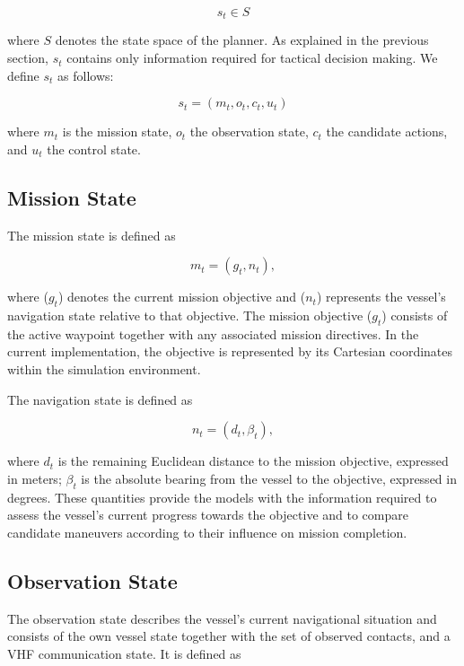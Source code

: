 \documentclass[10pt]{reportMaster}
\begin{document}
\begin{equation}
    s_t \in S
\end{equation}

where $S$ denotes the state space of the planner. As explained in the previous section, $s_t$ contains only information required for tactical decision making. We define $s_t$ as follows:

\begin{equation}
    s_t = (m_t, o_t, c_t, u_t)
\end{equation}

where $m_t$ is the mission state, $o_t$ the observation state, $c_t$ the candidate actions, and $u_t$ the control state.

\subsection{Mission State}

The mission state is defined as

\begin{equation}
m_t = (g_t, n_t),
\end{equation}

where ($g_t$) denotes the current mission objective and ($n_t$) represents the vessel's navigation state relative to that objective. The mission objective ($g_t$) consists of the active waypoint together with any associated mission directives. In the current implementation, the objective is represented by its Cartesian coordinates within the simulation environment.

The navigation state is defined as

\begin{equation}
n_t = (d_t, \beta_t),
\end{equation}

where $d_t$ is the remaining Euclidean distance to the mission objective, expressed in meters; $\beta_t$ is the absolute bearing from the vessel to the objective, expressed in degrees. These quantities provide the models with the information required to assess the vessel's current progress towards the objective and to compare candidate maneuvers according to their influence on mission completion.


\subsection{Observation State}

The observation state describes the vessel's current navigational situation and consists of the own vessel state together with the set of observed contacts, and a VHF communication state. It is defined as
\end{document}
